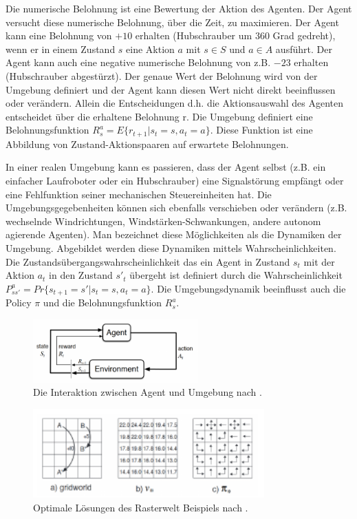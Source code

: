 \documentclass[conference]{IEEEtran}
\begin{document}
Die numerische Belohnung ist eine Bewertung der Aktion des Agenten. Der Agent versucht diese numerische Belohnung, über die Zeit, zu maximieren. Der Agent kann eine Belohnung von $+10$ erhalten (Hubschrauber um 360 Grad gedreht), wenn er in einem Zustand $s$ eine Aktion $a$ mit $s\in S$ und $a\in A$ ausführt. Der Agent kann auch eine negative numerische Belohnung von z.B. $-23$ erhalten (Hubschrauber abgestürzt). Der genaue Wert der Belohnung wird von der Umgebung definiert und der Agent kann diesen Wert nicht direkt beeinflussen oder verändern. Allein die Entscheidungen d.h. die Aktionsauswahl des Agenten entscheidet über die erhaltene Belohnung r. Die Umgebung definiert eine Belohnungsfunktion $R_s^a = E\{ r_{t+1} | s_t = s, a_t = a \}$. Diese Funktion ist eine Abbildung von Zustand-Aktionspaaren auf erwartete Belohnungen.

In einer realen Umgebung kann es passieren, dass der Agent selbst (z.B. ein einfacher Laufroboter oder ein Hubschrauber) eine Signalstörung empfängt oder eine Fehlfunktion seiner mechanischen Steuereinheiten hat. Die Umgebungsgegebenheiten können sich ebenfalls verschieben oder verändern (z.B. wechselnde Windrichtungen, Windstärken-Schwankungen, andere autonom agierende Agenten). Man bezeichnet diese Möglichkeiten als die Dynamiken der Umgebung. Abgebildet werden diese Dynamiken mittels Wahrscheinlichkeiten. Die Zustandsübergangswahrscheinlichkeit das ein Agent in Zustand $s_t$ mit der Aktion $a_t$ in den Zustand $s'_t$ übergeht ist definiert durch die Wahrscheinlichkeit $P^a_{ss'} = Pr \{ s_{t+1} = s' | s_t = s, a_t = a \}.$ Die Umgebungsdynamik beeinflusst auch die Policy $\pi$ und die Belohnungsfunktion $R^a_s$.

\begin{figure}[!t]
\centering
\includegraphics[width=2.5in]{agent_environment}
\caption{Die Interaktion zwischen Agent und Umgebung nach \cite{sutton_barto_12}.}
\label{agent_environment}
\end{figure}

\begin{figure}[!t]
\centering
\includegraphics[width=3.5in]{gridworld_example}
\caption{Optimale Lösungen des Rasterwelt Beispiels nach \cite{sutton_barto_12}.}
\label{gridworld_example}
\end{figure}
\end{document}
